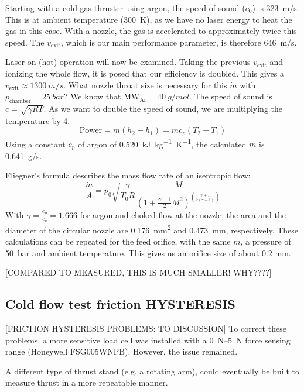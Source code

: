             Starting with a cold gas thruster using argon, the speed of sound ($c_0$) is \qty{323}{m/s}. This is at ambient temperature (\qty{300}{K}), as we have no laser energy to heat the gas in this case. With a nozzle, the gas is accelerated to approximately twice this speed. The $v_\mathrm{exit}$, which is our main performance parameter, is therefore \qty{646}{m/s}.
            
            Laser on (hot) operation will now be examined. Taking the previous $v_\mathrm{exit}$ and ionizing the whole flow, it is posed that our efficiency is doubled. This gives a $v_\mathrm{exit}\approx \qty{1300}{m/s}$. What nozzle throat size is necessary for this $\dot m$ with $p_\mathrm{chamber} = \qty{25}{bar}$? We know that $\mathrm{MW_{Ar}} = \qty{40}{g/mol}$. The speed of sound is $c = \sqrt{\gamma R T}$. As we want to double the speed of sound, we are multiplying the temperature by 4.
            \[\text{Power} = \dot m (h_2-h_1)
            = \dot m c_p (T_2-T_1)\]
            Using a constant $c_p$ of argon of \qty{0.520}{kJ.kg^{-1}.K^{-1}}, the calculated $\dot m$ is \qty{0.641}{g/s}.
            
            Fliegner's formula describes the mass flow rate of an isentropic flow:
            \[\frac{\dot m}{A} = p_0\sqrt{\frac{\gamma}{T_0 R}}\frac{M}{(1+\frac{\gamma-1}{2}M^2)^{(\frac{\gamma+1}{2(\gamma-1)})}}\]
            With $\gamma = \frac{c_p}{c_v} = 1.666$ for argon and choked flow at the nozzle, the area and the diameter of the circular nozzle are \qty{0.176}{mm^2} and \qty{0.473}{mm}, respectively. These calculations can be repeated for the feed orifice, with the same $\dot m$, a pressure of \qty{50}{bar} and ambient temperature. This gives us an orifice size of about 0.2 mm.

            [COMPARED TO MEASURED, THIS IS MUCH SMALLER! WHY????]
    
    \subsection{Cold flow test friction HYSTERESIS}

        [FRICTION HYSTERESIS PROBLEMS: TO DISCUSSION] To correct these problems, a more sensitive load cell was installed with a \qtyrange{0}{5}{N} force sensing range (Honeywell FSG005WNPB). However, the issue remained.

        A different type of thrust stand (e.g. a rotating arm), could eventually be built to measure thrust in a more repeatable manner.
    
